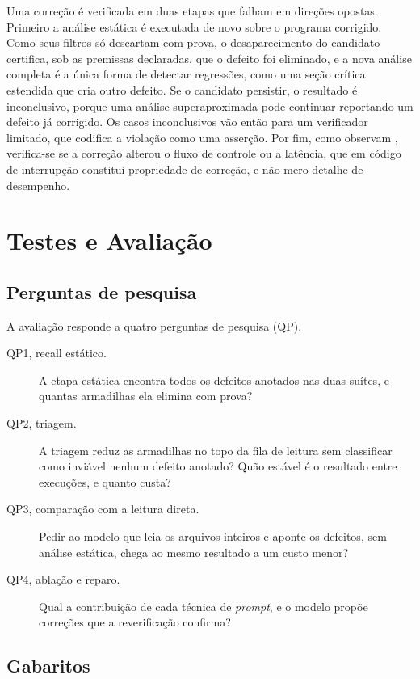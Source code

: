 Uma correção é verificada em duas etapas que falham em direções opostas.
Primeiro a análise estática é executada de novo sobre o programa corrigido.
Como seus filtros só descartam com prova, o desaparecimento do candidato
certifica, sob as premissas declaradas, que o defeito foi eliminado, e a nova análise
completa é a única forma de detectar regressões, como uma seção crítica
estendida que cria outro defeito. Se o candidato persistir, o resultado é
inconclusivo, porque uma análise superaproximada pode continuar reportando um
defeito já corrigido. Os casos inconclusivos vão então para um verificador
limitado, que codifica a violação como uma asserção. Por fim, como observam
, verifica-se se a correção alterou o fluxo de controle ou
a latência, que em código de interrupção constitui propriedade de correção, e
não mero detalhe de desempenho.

\section{Testes e Avaliação}
\label{sec:avaliacao}

\subsection{Perguntas de pesquisa}

A avaliação responde a quatro perguntas de pesquisa (QP).

\begin{description}
  \item[QP1, recall estático.] A etapa estática encontra todos os defeitos
  anotados nas duas suítes, e quantas armadilhas ela elimina com prova?
  \item[QP2, triagem.] A triagem reduz as armadilhas no topo da fila de leitura
  sem classificar como inviável nenhum defeito anotado? Quão estável é o
  resultado entre execuções, e quanto custa?
  \item[QP3, comparação com a leitura direta.] Pedir ao modelo que leia os
  arquivos inteiros e aponte os defeitos, sem análise estática, chega ao mesmo
  resultado a um custo menor?
  \item[QP4, ablação e reparo.] Qual a contribuição de cada técnica de
  \textit{prompt}, e o modelo propõe correções que a reverificação confirma?
\end{description}

\subsection{Gabaritos}

